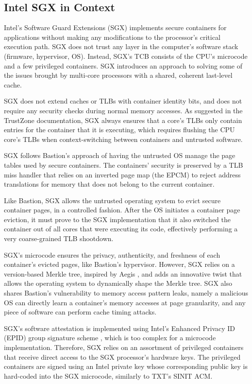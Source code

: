 \subsection{Intel SGX in Context}

Intel's Software Guard Extensions (SGX) \cite{mckeen2013sgx, anati2013sgx,
hoekstra2013sgx} implements secure containers for applications without making
any modifications to the processor's critical execution path. SGX does not
trust any layer in the computer's software stack (firmware, hypervisor, OS).
Instead, SGX's TCB consists of the CPU's microcode and a few privileged
containers. SGX introduces an approach to solving some of the issues brought by
multi-core processors with a shared, coherent last-level cache.

SGX does not extend caches or TLBs with container identity bits, and does not
require any security checks during normal memory accesses. As suggested in the
TrustZone documentation, SGX always ensures that a core's TLBs only contain
entries for the container that it is executing, which requires flushing the CPU
core's TLBs when context-switching between containers and untrusted software.

SGX follows Bastion's approach of having the untrusted OS manage the page
tables used by secure containers. The containers' security is preserved by a
TLB miss handler that relies on an inverted page map (the EPCM) to reject
address translations for memory that does not belong to the current container.

Like Bastion, SGX allows the untrusted operating system to evict secure
container pages, in a controlled fashion. After the OS initiates a container
page eviction, it must prove to the SGX implementation that it also switched
the container out of all cores that were executing its code, effectively
performing a very coarse-grained TLB shootdown.

SGX's microcode ensures the privacy, authenticity, and freshness of each
container's evicted pages, like Bastion's hypervisor. However, SGX relies on a
version-based Merkle tree, inspired by Aegis \cite{suh2003aegis}, and adds an innovative twist
that allows the operating system to dynamically shape the Merkle tree. SGX also
shares Bastion's vulnerability to memory access pattern leaks, namely a
malicious OS can directly learn a container's memory accesses at page
granularity, and any piece of software can perform cache timing attacks.

SGX's software attestation is implemented using Intel's Enhanced Privacy ID
(EPID) group signature scheme \cite{brickell2009epid}, which is too complex for
a microcode implementation. Therefore, SGX relies on an assortment of
privileged containers that receive direct access to the SGX processor's
hardware keys. The privileged containers are signed using an Intel private key
whose corresponding public key is hard-coded into the SGX microcode, similarly
to TXT's SINIT ACM.

